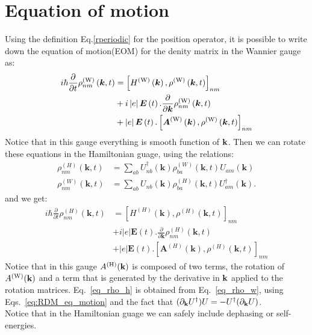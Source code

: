 \documentclass[preprint,showpacs,prb,superscriptaddress,aps,floatfix]{revtex4-1}
\newcommand{\kk}{{\bf k}}
\renewcommand{\[}{\left[}
\renewcommand{\]}{\right]}
\renewcommand{\(}{\left(}
\renewcommand{\)}{\right)}
\def\pw{^{({\rm W})}}
\def\ph{^{({\rm H})}}
\begin{document}
\section{Equation of motion}
Using the definition Eq.\ref{rperiodic} for the position operator, it is possible to write down the equation of motion(EOM) for the denity matrix in the Wannier gauge as:
\begin{align}
i\hbar\frac{\partial}{\partial t}\rho\pw_{nm}\left(\boldsymbol{k},t\right) & =\left[H\pw\left(\boldsymbol{k}\right),\rho\pw\left(\boldsymbol{k},t\right)\right]_{nm}\nonumber \\
 & +i\left|e\right|\boldsymbol{E}\left(t\right).\frac{\partial}{\partial\boldsymbol{k}}\rho\pw_{nm}\left(\boldsymbol{k},t\right)\nonumber \\
 & +\left|e\right|\boldsymbol{E}\left(t\right).\left[\boldsymbol{A}\pw\left(\boldsymbol{k}\right),\rho\pw\left(\boldsymbol{k},t\right)\right]_{nm}\label{eq:RDM_eq_motion}
\end{align}
Notice that in this gauge everything is smooth function of $\kk$. Then we can rotate these equations in the Hamiltonian guage, using the relations:
\begin{align}
\rho_{nm}^{\left(H\right)}\left(\boldsymbol{k},t\right) & =\sum_{ab}U_{nb}^{\dagger}\left(\boldsymbol{k}\right)\rho_{ba}^{\left(W\right)}\left(\boldsymbol{k},t\right)U_{am}\left(\boldsymbol{k}\right)\\
	\rho_{nm}^{\left(W\right)}\left(\boldsymbol{k},t\right) & =\sum_{ab}U_{nb}\left(\boldsymbol{k}\right)\rho_{ba}^{\left(H\right)}\left(\boldsymbol{k},t\right)U_{am}^{\dagger}\left(\boldsymbol{k}\right). \label{eq_rho_w}
\end{align}
and we get:
\begin{align}
i\hbar\frac{\partial}{\partial t}\rho_{nm}^{\left(H\right)}\left(\boldsymbol{k},t\right) & =\left[H^{\left(H\right)}\left(\boldsymbol{k}\right),\rho^{\left(H\right)}\left(\boldsymbol{k},t\right)\right]_{nm}\nonumber \\
 & +i\left|e\right|\boldsymbol{E}\left(t\right).\frac{\partial}{\partial\boldsymbol{k}}\rho_{nm}^{\left(H\right)}\left(\boldsymbol{k},t\right)\nonumber \\
	& +\left|e\right|\boldsymbol{E}\left(t\right).\left[\boldsymbol{A}^{\left(H\right)}\left(\boldsymbol{k}\right),\rho^{\left(H\right)}\left(\boldsymbol{k},t\right)\right]_{nm} \label{eq_rho_h}
\end{align}
Notice that in this gauge $A\ph(\kk)$ is composed of two terms, the rotation of $A\pw(\kk)$ and a term that is generated by the derivative in $\kk$ applied to the rotation matrices. Eq.~\ref{eq_rho_h} is obtained from Eq.~\ref{eq_rho_w}, using Eqs.~\ref{eq:RDM_eq_motion} and the fact that $(\partial_\kk  U^\dagger) U = - U^\dagger( \partial_\kk U) $.\\
Notice that in the Hamiltonian guage we can safely include dephasing or self-energies.
\end{document}
